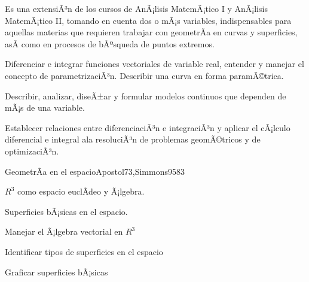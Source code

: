 
\begin{syllabus}


\begin{justification}
Es una extensiÃ³n de los cursos de AnÃ¡lisis MatemÃ¡tico I y AnÃ¡lisis MatemÃ¡tico II, tomando en cuenta dos o mÃ¡s variables, indispensables para aquellas materias que requieren trabajar con geometrÃ­a en curvas y superficies, asÃ­ como en procesos de bÃºsqueda de puntos extremos.
\end{justification}

\begin{goals}
\item Diferenciar e integrar funciones vectoriales de variable real, entender y manejar el concepto de parametrizaciÃ³n. Describir una curva en forma paramÃ©trica.
\item Describir, analizar, diseÃ±ar y formular modelos continuos que dependen de mÃ¡s de una variable.
\item Establecer relaciones entre diferenciaciÃ³n e integraciÃ³n y aplicar el cÃ¡lculo diferencial e integral ala resoluciÃ³n de problemas geomÃ©tricos y de optimizaciÃ³n.
\end{goals}

\begin{outcomes}
\end{outcomes}

\begin{unit}{GeometrÃ­a en el espacio}{Apostol73,Simmons95}{8}{3}
   \begin{topics}
      \item $R^3$ como espacio euclÃ­deo y Ã¡lgebra.
      \item Superficies bÃ¡sicas en el espacio.
   \end{topics}

   \begin{learningoutcomes}
      \item Manejar el Ã¡lgebra vectorial en $R^3$
      \item Identificar tipos de superficies en el espacio
      \item Graficar superficies bÃ¡sicas
      \end{learningoutcomes}
\end{unit}


\end{syllabus}
